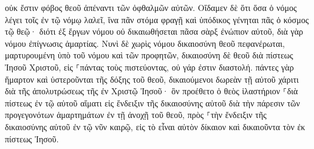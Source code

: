 \documentclass{openreader}
\begin{document}
οὐκ ἔστιν φόβος θεοῦ ἀπέναντι τῶν ὀφθαλμῶν αὐτῶν. 
Οἴδαμεν δὲ ὅτι ὅσα ὁ νόμος λέγει τοῖς ἐν τῷ νόμῳ λαλεῖ, ἵνα πᾶν στόμα φραγῇ καὶ ὑπόδικος γένηται πᾶς ὁ κόσμος τῷ θεῷ· 
διότι ἐξ ἔργων νόμου οὐ δικαιωθήσεται πᾶσα σὰρξ ἐνώπιον αὐτοῦ, διὰ γὰρ νόμου ἐπίγνωσις ἁμαρτίας. 
Νυνὶ δὲ χωρὶς νόμου δικαιοσύνη θεοῦ πεφανέρωται, μαρτυρουμένη ὑπὸ τοῦ νόμου καὶ τῶν προφητῶν, 
δικαιοσύνη δὲ θεοῦ διὰ πίστεως Ἰησοῦ Χριστοῦ, εἰς ⸀πάντας τοὺς πιστεύοντας, οὐ γάρ ἐστιν διαστολή. 
πάντες γὰρ ἥμαρτον καὶ ὑστεροῦνται τῆς δόξης τοῦ θεοῦ, 
δικαιούμενοι δωρεὰν τῇ αὐτοῦ χάριτι διὰ τῆς ἀπολυτρώσεως τῆς ἐν Χριστῷ Ἰησοῦ· 
ὃν προέθετο ὁ θεὸς ἱλαστήριον ⸀διὰ πίστεως ἐν τῷ αὐτοῦ αἵματι εἰς ἔνδειξιν τῆς δικαιοσύνης αὐτοῦ διὰ τὴν πάρεσιν τῶν προγεγονότων ἁμαρτημάτων 
ἐν τῇ ἀνοχῇ τοῦ θεοῦ, πρὸς ⸀τὴν ἔνδειξιν τῆς δικαιοσύνης αὐτοῦ ἐν τῷ νῦν καιρῷ, εἰς τὸ εἶναι αὐτὸν δίκαιον καὶ δικαιοῦντα τὸν ἐκ πίστεως Ἰησοῦ. 
\end{document}
